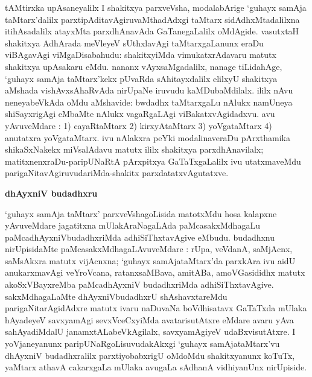 tAMtirxka upAsaneyalilx I shakitxya parxveVsha, modalabArige `guhayx samAja taMtarx'dalilx parxtipAditavAgiruvaMthadAdxgi taMtarx sidAdhxMtadalilxna itihAsadalilx atayxMta parxdhAnavAda GaTanegaLalilx oMdAgide. vasutxtaH shakitxya AdhArada meVleyeV sUthxlavAgi taMtarxgaLanunx eraDu viBAgavAgi viMgaDisabahudu: shakitxyiMda vimukatxrAdavaru matutx shakitxya upAsakaru eMdu. nananx vAyxsaMgadalilx, nanage tiLidahAge, `guhayx samAja taMtarx'kekx pUvaRda sAhitayxdalilx elilxyU shakitxya aMshada vishAvxsAhaRvAda nirUpaNe iruvudu kaMDubaMdilalx. ililx nAvu neneyabeVkAda oMdu aMshavide: bwdadhx taMtarxgaLu nAlukx namUneya shiSayxrigAgi eMbaMte nAlukx vagaRgaLAgi viBakatxvAgidadxvu. avu yAvuveMdare : {\rm 1)} cayaRtaMtarx {\rm 2)} kirxyAtaMtarx {\rm 3)} yoVgataMtarx {\rm 4)} anutatxra yoVgataMtarx. ivu nAlakxra peYki modalinaveraDu pArxthamika shikaSxNakekx miVsalAdavu matutx ililx shakitxya parxdhAnavilalx; matitxnenxraDu-paripUNaRtA pArxpitxya GaTaTxgaLalilx ivu utatxmaveMdu parigaNitavAgiruvudariMda-shakitx parxdatatxvAgutatxve. 

\smallskip
\begin{center}
{\Large\bf dhAyxniV budadhxru}
\end{center}

`guhayx samAja taMtarx' parxveVshagoLisida matotxMdu hosa kalapxne yAvuveMdare jagatitxna mUlakAraNagaLAda paMcasakxMdhagaLu paMcadhAyxniVbudadhxriMda adhiSiThxtavAgive eMbudu. budadhxnu nirUpisidaMte paMcasakxMdhagaLAvuveMdare : rUpa, veVdanA, saMjAcnx, saMsAkxra matutx vijAcnxna; `guhayx samAjataMtarx'da parxkAra ivu aidU anukarxmavAgi veYroVcana, ratanxsaMBava, amitABa, amoVGasididhx matutx akoSxVBayxreMba paMcadhAyxniV budadhxriMda adhiSiThxtavAgive. sakxMdhagaLaMte dhAyxniVbudadhxrU shAshavxtareMdu parigaNitarAgidAdxre matutx ivaru naDuvaNa boVdhisatavx GaTaTxda mUlaka hAyadeyeV savxyamAgi sevxVceCxyiMda avatarisutAtxre eMdare avaru yAva sahAyadiMdalU janamxtALabeVkAgilalx, savxyamAgiyeV udaBxvisutAtxre. I yoVjaneyanunx paripUNaRgoLisuvudakAkxgi `guhayx samAjataMtarx'vu dhAyxniV budadhxralilx parxtiyobabxrigU oMdoMdu shakitxyanunx koTuTx, yaMtarx athavA cakarxgaLa mUlaka avugaLa sAdhanA vidhiyanUnx nirUpiside.

